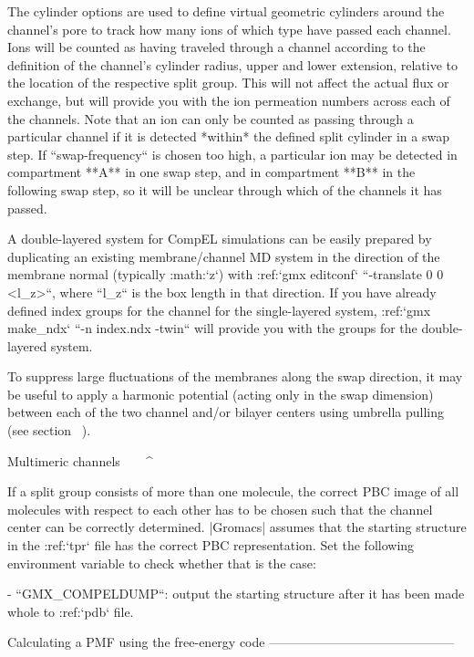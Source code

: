 The cylinder options are used to define virtual geometric cylinders
around the channel’s pore to track how many ions of which type have
passed each channel. Ions will be counted as having traveled through a
channel according to the definition of the channel’s cylinder radius,
upper and lower extension, relative to the location of the respective
split group. This will not affect the actual flux or exchange, but will
provide you with the ion permeation numbers across each of the channels.
Note that an ion can only be counted as passing through a particular
channel if it is detected *within* the defined split cylinder in a swap
step. If ``swap-frequency`` is chosen too high, a particular
ion may be detected in compartment **A** in one swap step, and in
compartment **B** in the following swap step, so it will be unclear
through which of the channels it has passed.

A double-layered system for CompEL simulations can be easily prepared by
duplicating an existing membrane/channel MD system in the direction of
the membrane normal (typically :math:`z`) with 
:ref:`gmx editconf` ``-translate 0 0 <l_z>``, where ``l_z`` is the box
length in that direction. If you have already defined index groups for
the channel for the single-layered system, :ref:`gmx make_ndx`
``-n index.ndx -twin`` will provide you with the groups for the
double-layered system.

To suppress large fluctuations of the membranes along the swap
direction, it may be useful to apply a harmonic potential (acting only
in the swap dimension) between each of the two channel and/or bilayer
centers using umbrella pulling (see
section 
).

Multimeric channels
^^^^^^^^^^^^^^^^^^^

If a split group consists of more than one molecule, the correct PBC
image of all molecules with respect to each other has to be chosen such
that the channel center can be correctly determined. |Gromacs| assumes
that the starting structure in the :ref:`tpr` file has the
correct PBC representation. Set the following environment variable to
check whether that is the case:

-  ``GMX_COMPELDUMP``: output the starting structure after
   it has been made whole to :ref:`pdb` file.

Calculating a PMF using the free-energy code
--------------------------------------------

